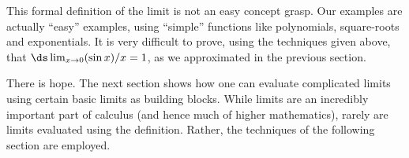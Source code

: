 This formal definition of the limit is not an easy concept grasp. Our examples are actually ``easy'' examples, using ``simple'' functions like polynomials, square-roots and exponentials. It is very difficult to prove, using the techniques given above, that $\ds \lim_{x\to 0}(\sin x)/x = 1$, as we approximated in the previous section.

There is hope. The next section shows how one can evaluate complicated limits using certain basic limits as building blocks. While limits are an incredibly important part of calculus (and hence much of higher mathematics), rarely are limits evaluated using the definition. Rather, the techniques of the following section are employed.


